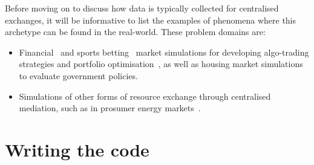 Before moving on to discuss how data is typically collected for centralised exchanges, it will be informative to list the examples of phenomena where this archetype can be found in the real-world. These problem domains are:
\begin{itemize}
\item{Financial~\cite{fischer2018reinforcement,meng2019reinforcement} and sports betting~\cite{cliff2021bbe} market simulations for developing algo-trading strategies and portfolio optimisation~\cite{dangi2013financial}, as well as housing market simulations~\cite{yilmaz2018stochastic,carro2023heterogeneous} to evaluate government policies.}
\item{Simulations of other forms of resource exchange through centralised mediation, such as in prosumer energy markets~\cite{may2023multi}.} 
\end{itemize}

\section{\sffamily Writing the code}
